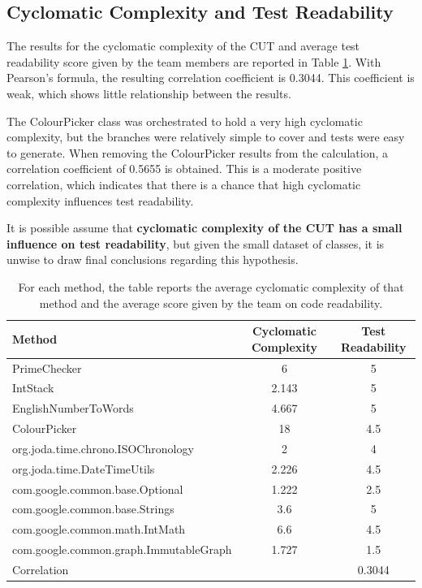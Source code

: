 \subsection{Cyclomatic Complexity and Test Readability}

The results for the cyclomatic complexity of the CUT and average test readability score given by the team members are reported in Table \ref{cycread}.
With Pearson's formula, the resulting correlation coefficient is 0.3044.
This coefficient is weak, which shows little relationship between the results.

The ColourPicker class was orchestrated to hold a very high cyclomatic complexity, but the branches were relatively simple to cover and tests were easy to generate. 
When removing the ColourPicker results from the calculation, a correlation coefficient of 0.5655 is obtained. 
This is a moderate positive correlation, which indicates that there is a chance that high cyclomatic complexity influences test readability. 

It is possible assume that \textbf{cyclomatic complexity of the CUT has a small influence on test readability}, but given the small dataset of classes, it is unwise to draw final conclusions regarding this hypothesis.

{\setlength{\extrarowheight}{1ex}
\begin{table}[tbp]
\begin{center}
\begin{tabular}{ m{6cm} c c }
\hline 
Method & Cyclomatic Complexity & Test Readability \\ [0.5ex]
\hline
PrimeChecker & 6 & 5 \\ [0.5ex]
IntStack & 2.143 & 5  \\ [0.5ex]
EnglishNumberToWords & 4.667 & 5  \\ [0.5ex]
ColourPicker & 18 & 4.5 \\ [0.5ex]
org.joda.time.chrono.ISOChronology & 2 & 4 \\ [0.5ex]
org.joda.time.DateTimeUtils & 2.226 & 4.5 \\ [0.5ex]
com.google.common.base.Optional & 1.222 & 2.5 \\ [0.5ex]
com.google.common.base.Strings & 3.6 & 5 \\ [0.5ex]
com.google.common.math.IntMath & 6.6 & 4.5 \\ [0.5ex]
com.google.common.graph.ImmutableGraph &  1.727 & 1.5 \\ [0.5ex]
\hline
\multicolumn{2}{m{6cm}}{Correlation} &  0.3044 \\ [0.5ex]
\hline
\end{tabular}
\end{center}
\caption{For each method, the table reports the average cyclomatic complexity of that method and the average score given by the team on code readability.}
\label{cycread}
\end{table}
}

